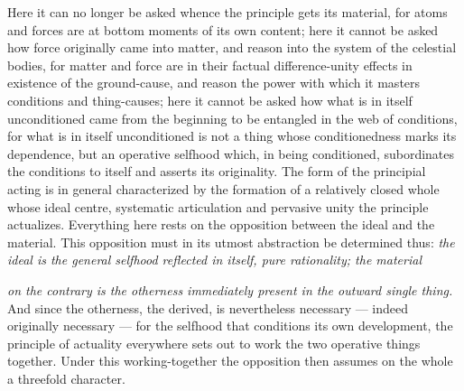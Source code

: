 \documentclass[12pt,a4paper]{book}
\begin{document}
Here it can no longer be asked whence the principle gets its material, for
atoms and forces are at bottom moments of its own content; here it cannot be
asked how force originally came into matter, and reason into the system of the
celestial bodies, for matter and force are in their factual difference-unity
effects in existence of the ground-cause, and reason the power with which it
masters conditions and thing-causes; here it cannot be asked how what is in
itself unconditioned came from the beginning to be entangled in the web of
conditions, for what is in itself unconditioned is not a thing whose
conditionedness marks its dependence, but an operative selfhood which, in being
conditioned, subordinates the conditions to itself and asserts its originality.
The form of the principial acting is in general characterized by the formation
of a relatively closed whole whose ideal centre, systematic articulation and
pervasive unity the principle actualizes. Everything here rests on the
opposition between the ideal and the material. This opposition must in its
utmost abstraction be determined thus: \emph{the ideal is the general selfhood
reflected in itself, pure rationality; the material}

\setcounter{footnote}{0}
\emph{on the contrary is the otherness immediately present in the outward
single thing.} And since the otherness, the derived, is nevertheless necessary
--- indeed originally necessary --- for the selfhood that conditions its own
development, the principle of actuality everywhere sets out to work the two
operative things together. Under this working-together the opposition then
assumes on the whole a threefold character.
\end{document}

